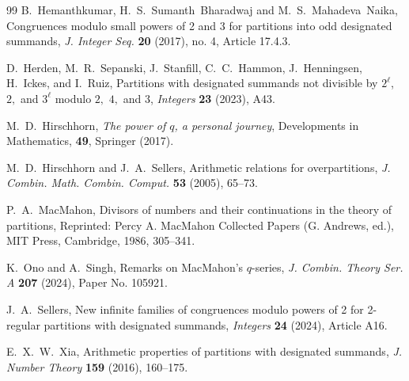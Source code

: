 \documentclass[11pt,reqno]{amsart}
\numberwithin{equation}{section}
\theoremstyle{plain}
\theoremstyle{definition}
\theoremstyle{named}
\begin{document}
\begin{thebibliography}{99}
B.~Hemanthkumar,  H.~S.~Sumanth~Bharadwaj and M.~S.~Mahadeva~Naika, Congruences modulo small powers of 2 and 3 for partitions into odd designated summands, {\it J. Integer Seq.} {\bf 20} (2017), no. 4, Article 17.4.3.

 D.~Herden, M.~R.~Sepanski, J.~Stanfill, C.~C.~Hammon, J.~Henningsen, H.~Ickes, and I.~Ruiz, Partitions with designated summands not divisible by $2^\ell$, $2,$ and $3^\ell$ modulo $2,$ $4,$ and $3$, {\it Integers} {\bf 23} (2023), A43.

  M.~D.~Hirschhorn, {\it The power of $q$, a personal journey}, Developments in Mathematics, {\bf 49}, Springer (2017).

 M.~D.~Hirschhorn and J.~A.~Sellers, Arithmetic relations for overpartitions, {\it J. Combin. Math. Combin. Comput.} {\bf 53} (2005), 65--73.

P.~A.~MacMahon, Divisors of numbers and their continuations in the theory of partitions,
Reprinted: Percy A. MacMahon Collected Papers (G. Andrews, ed.), MIT Press, Cambridge,
1986, 305--341.

K.~Ono and A.~Singh, Remarks on MacMahon's $q$-series, {\it J. Combin. Theory Ser. A} {\bf 207} (2024), Paper No. 105921.

 J.~A.~Sellers, New infinite families of congruences modulo powers of 2 for 2-regular partitions with designated summands, {\it Integers} {\bf 24} (2024), Article A16.

E.~X.~W.~Xia, Arithmetic properties of partitions with designated summands, {\it J. Number Theory} {\bf 159} (2016), 160--175.  

\end{thebibliography}
\end{document}
